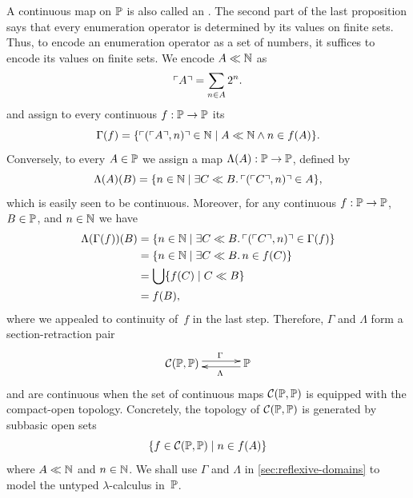 A continuous map on $\mathbb{P}$ is also called an .
%
The second part of the last proposition says that every enumeration operator is determined by its values on finite sets. Thus, to encode an enumeration operator as a set of numbers, it suffices to encode its values on finite sets.
We encode $A \ll \mathbb{N}$ as
%
\begin{equation*}
  \ulcorner A \urcorner = \sum_{n \in A} 2^n.
\end{equation*}
%
and assign to every continuous $f : \mathbb{P} \to \mathbb{P}$ its
%
\begin{equation*}
  \Gamma(f) = \{\ulcorner (\ulcorner A \urcorner, n) \urcorner \in \mathbb{N} \mid
    A \ll \mathbb{N} \land n \in f(A)
  \}.
\end{equation*}
%
Conversely, to every $A \in \mathbb{P}$ we assign a map $\Lambda(A) : \mathbb{P} \to \mathbb{P}$, defined by
%
\begin{equation*}
  \Lambda(A)(B) = \{n \in \mathbb{N} \mid
    \exists C \ll B .\, \ulcorner (\ulcorner C \urcorner, n) \urcorner \in A
  \},
\end{equation*}
%
which is easily seen to be continuous.
Moreover, for any continuous $f : \mathbb{P} \to \mathbb{P}$, $B \in \mathbb{P}$, and $n \in \mathbb{N}$ we have
%
\begin{align*}
  \Lambda(\Gamma(f))(B)
  &= \{n \in \mathbb{N} \mid \exists C \ll B .\, \ulcorner (\ulcorner C \urcorner, n) \urcorner \in \Gamma(f)\} \\
  &= \{n \in \mathbb{N} \mid \exists C \ll B .\, n \in f(C)\} \\
  &= \bigcup \{f(C) \mid C \ll B\} \\
  &= f(B),
\end{align*}
%
where we appealed to continuity of~$f$ in the last step.
%
Therefore, $\Gamma$ and $\Lambda$ form a section-retraction pair
%
\begin{equation}
  \label{eq:scott-section-retraction}
  \xymatrix{
    **[l]{\mathcal{C}(\Scott, \Scott)}
    \ar@<+0.25em>[r]^{\Gamma}
    &
    {\Scott}
    \ar@<+0.25em>[l]^{\Lambda}
  }
\end{equation}
%
and are continuous when the set of continuous maps $\mathcal{C}(\mathbb{P}, \mathbb{P})$ is equipped with the compact-open topology. Concretely, the topology of $\mathcal{C}(\mathbb{P}, \mathbb{P})$ is generated by subbasic open sets
%
\begin{equation*}
  \{ f \in \mathcal{C}(\mathbb{P}, \mathbb{P}) \mid
        n \in f(A)
  \}
\end{equation*}
%
where $A \ll \mathbb{N}$ and $n \in \mathbb{N}$.
%
We shall use $\Gamma$ and $\Lambda$ in \cref{sec:reflexive-domains} to model the untyped $\lambda$-calculus in~$\mathbb{P}$.

